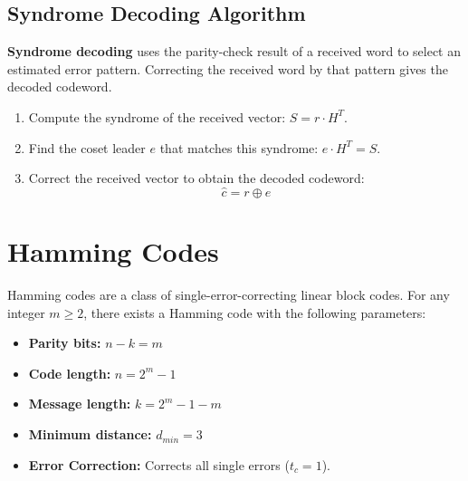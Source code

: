 \documentclass[12pt,a4paper]{article}
\begin{document}
\subsection{Syndrome Decoding Algorithm}
\begin{tcolorbox}[defbox, title={Syndrome Decoding}]
\textbf{Syndrome decoding} uses the parity-check result of a received word to select an estimated error pattern. Correcting the received word by that pattern gives the decoded codeword.
\end{tcolorbox}

\begin{tcolorbox}[formulabox, title={\textbf{Syndrome Decoding Steps}}]
\begin{enumerate}[label=\textbf{Step \arabic*:}, leftmargin=2.0cm, itemsep=2pt]
  \item Compute the syndrome of the received vector: $S = r \cdot H^T$.
  \item Find the coset leader $e$ that matches this syndrome: $e \cdot H^T = S$.
  \item Correct the received vector to obtain the decoded codeword:
    \[ \hat{c} = r \oplus e \]
\end{enumerate}
\end{tcolorbox}

\section{Hamming Codes}

Hamming codes are a class of single-error-correcting linear block codes. For any integer $m \ge 2$, there exists a Hamming code with the following parameters:

\begin{tcolorbox}[defbox, title={\textbf{Hamming Code Parameters}}]
\begin{itemize}[leftmargin=*, itemsep=3pt, topsep=0pt]
  \item \textbf{Parity bits:} $n - k = m$
  \item \textbf{Code length:} $n = 2^m - 1$
  \item \textbf{Message length:} $k = 2^m - 1 - m$
  \item \textbf{Minimum distance:} $d_{min} = 3$
  \item \textbf{Error Correction:} Corrects all single errors ($t_c = 1$).
\end{itemize}
\end{tcolorbox}
\end{document}
